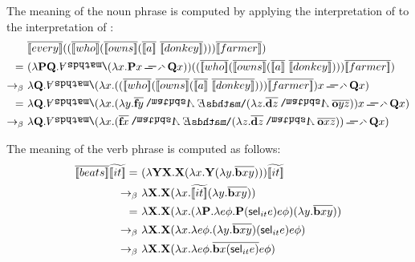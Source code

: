 \begin{example}
The meaning of the noun phrase  is computed by applying the interpretation of  to the interpretation of : 
\begin{align}
& \tr{\I{every}}  ((\tr{\I{who}}  (\tr{\I{owns}}  (\tr{\I{a}} \ \tr{\I{donkey}} ) )) \tr{\I{farmer}}  )  \notag \\
= \ & (\lambda \P2 \Q2. \all2 (\lambda \x1.  \P2 \x1 \impK2 \Q2 \x1 ) ) ((\tr{\I{who}}  (\tr{\I{owns}}  (\tr{\I{a}} \ \tr{\I{donkey}} ) )) \tr{\I{farmer}}  )  \notag \\
\bconv \ & \lambda \Q2. \all2 (\lambda \x1.  ((\tr{\I{who}}  (\tr{\I{owns}}  (\tr{\I{a}} \ \tr{\I{donkey}} ) )) \tr{\I{farmer}}  ) \x1 \impK2 \Q2 \x1 )   \notag \\
= \ & \lambda \Q2. \all2 (\lambda \x1.  (\lambda  \y1.  \tr{\cfarmer \y1} \cnj2   \ex2 (\lambda \z1. \tr{\cdonkey \z1} \cnj2  \tr{\cown \y1 \z1}  )   ) \x1 \impK2 \Q2 \x1)    \notag \\
\bconv \ & \lambda \Q2. \all2 (\lambda \x1.  ( \tr{\cfarmer \x1} \cnj2   \ex2 (\lambda \z1.  \tr{\cdonkey \z1} \cnj2  \tr{\cown \x1 \z1}  ) )  \impK2 \Q2 \x1)   \label{eq:everyfarmerwhoownsadonkey}
\end{align}

The meaning of the verb phrase  is computed as follows:
\begin{align}
\tr{\I{beats}}  \etr{\I{it}}  = \ &  (\lambda \Y2 \X2. \X2 ( \lambda \x1. \Y2 (\lambda \y1.  \tr{\cbeat \x1 \y1} ))) \etr{\I{it}} \notag  \\
\bconv \ &  \lambda  \X2. \X2 ( \lambda \x1.  \etr{\I{it}}  (\lambda \y1.  \tr{\cbeat \x1 \y1} ))\notag  \\
= \ & \lambda  \X2. \X2 ( \lambda \x1.  ( \lambda \P2. \lambda e \phi. \P2 ( \selK_{it} e ) e \phi)    (\lambda \y1.  \tr{\cbeat \x1 \y1} ))\notag  \\
\bconv \ & \lambda  \X2. \X2 ( \lambda \x1.   \lambda e \phi.  (\lambda \y1.  \tr{\cbeat \x1 \y1} ) ( \selK_{it} e ) e \phi  )\notag  \\
\bconv \ & \lambda  \X2. \X2 ( \lambda \x1.   \lambda e \phi.  \tr{\cbeat \x1 ( \selK_{it} e )} e \phi  ) \label{eq:beatsit}
\end{align}


\end{example}
